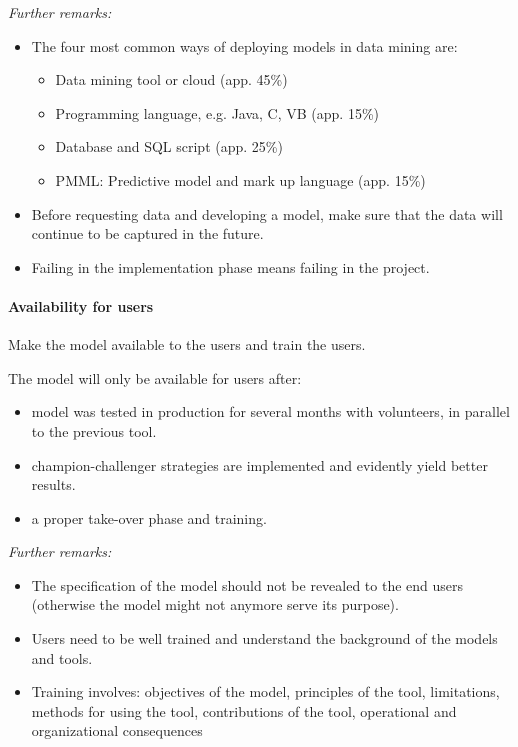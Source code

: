 \documentclass[a4paper, landscape, 6pt, fleqn]{scrartcl}
\begin{document}
\begin{multicols*}{4}
\textit{Further remarks:}
\begin{itemize}
\item The four most common ways of deploying models in data mining are:
\begin{itemize}
\item Data mining tool or cloud (app. 45\%)
\item Programming language, e.g. Java, C, VB (app. 15\%)
\item Database and SQL script (app. 25\%)
\item PMML: Predictive model and mark up language (app. 15\%)
\end{itemize}
\item Before requesting data and developing a model, make sure that the data will continue to be captured in the future.
\item Failing in the implementation phase means failing in the project.
\end{itemize}

\paragraph{Availability for users}

Make the model available to the users and train the users.

The model will only be available for users after:
\begin{itemize}
\item model was tested in production for several months with volunteers, in parallel to the previous tool.
\item champion-challenger strategies are implemented and evidently yield better results.
\item a proper take-over phase and training.
\end{itemize}

\textit{Further remarks:}
\begin{itemize}
\item The specification of the model should not be revealed to the end users (otherwise the model might not anymore serve its purpose).
\item Users need to be well trained and understand the background of the models and tools.
\item Training involves: objectives of the model, principles of the tool, limitations, methods for using the tool, contributions of the tool, operational and organizational consequences
\end{itemize}


\end{multicols*}
\end{document}
